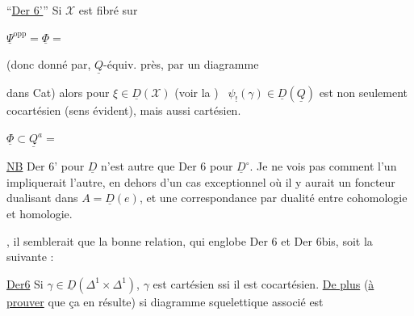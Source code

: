 
``\uline{Der 6'}'' Si $\mathcal X$ est fibré sur


$\underline\Psi^{\mathrm{opp}}=\underline\Phi={}$

(donc donné par, $\underline Q$-équiv. près, par un diagramme



dans Cat) alors pour $\xi\in\underline D(\mathcal X)$  (voir la ) \ $\psi_!(\gamma)\in\underline D(\underline Q)$ est non seulement cocartésien (sens évident), mais aussi cartésien.

$\underline\Phi\subset\underline Q^a={}$

\uline{NB} Der 6' pour $\underline D$  n'est autre que Der 6 pour $\underline D^\circ$. Je ne vois pas comment l'un impliquerait l'autre, en dehors d'un cas exceptionnel où il y aurait  un foncteur dualisant dans $A=\underline D(e)$, et une correspondance par dualité entre cohomologie et homologie.

, il semblerait que la bonne relation, qui englobe Der 6 et Der 6bis, soit la suivante :



\uline{Der6} Si $\gamma\in\underline D(\Delta^1\times\Delta^1)$, $\gamma$ est cartésien ssi il est cocartésien. \uline{De plus} (\uline{à prouver} que ça en résulte) si diagramme squelettique associé est
